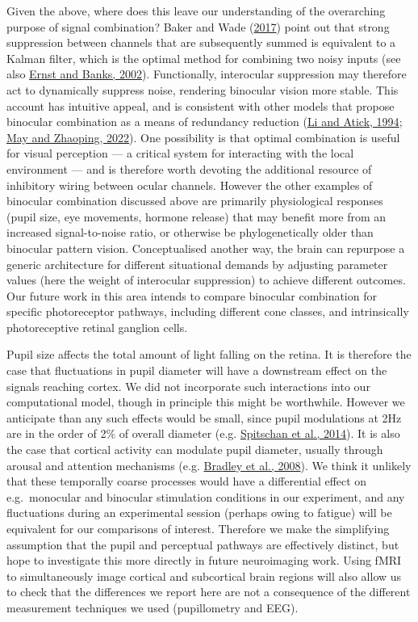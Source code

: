 \documentclass[
]{article}
\begin{document}
Given the above, where does this leave our understanding of the overarching purpose of signal combination? Baker and Wade (\protect\hyperlink{ref-Baker2017}{2017}) point out that strong suppression between channels that are subsequently summed is equivalent to a Kalman filter, which is the optimal method for combining two noisy inputs (see also \protect\hyperlink{ref-Ernst2002}{Ernst and Banks, 2002}). Functionally, interocular suppression may therefore act to dynamically suppress noise, rendering binocular vision more stable. This account has intuitive appeal, and is consistent with other models that propose binocular combination as a means of redundancy reduction (\protect\hyperlink{ref-Li1994}{Li and Atick, 1994}; \protect\hyperlink{ref-May2022}{May and Zhaoping, 2022}). One possibility is that optimal combination is useful for visual perception --- a critical system for interacting with the local environment --- and is therefore worth devoting the additional resource of inhibitory wiring between ocular channels. However the other examples of binocular combination discussed above are primarily physiological responses (pupil size, eye movements, hormone release) that may benefit more from an increased signal-to-noise ratio, or otherwise be phylogenetically older than binocular pattern vision. Conceptualised another way, the brain can repurpose a generic architecture for different situational demands by adjusting parameter values (here the weight of interocular suppression) to achieve different outcomes. Our future work in this area intends to compare binocular combination for specific photoreceptor pathways, including different cone classes, and intrinsically photoreceptive retinal ganglion cells.

Pupil size affects the total amount of light falling on the retina. It is therefore the case that fluctuations in pupil diameter will have a downstream effect on the signals reaching cortex. We did not incorporate such interactions into our computational model, though in principle this might be worthwhile. However we anticipate than any such effects would be small, since pupil modulations at 2Hz are in the order of 2\% of overall diameter (e.g. \protect\hyperlink{ref-Spitschan2014}{Spitschan et al., 2014}). It is also the case that cortical activity can modulate pupil diameter, usually through arousal and attention mechanisms (e.g. \protect\hyperlink{ref-Bradley2008}{Bradley et al., 2008}). We think it unlikely that these temporally coarse processes would have a differential effect on e.g.~monocular and binocular stimulation conditions in our experiment, and any fluctuations during an experimental session (perhaps owing to fatigue) will be equivalent for our comparisons of interest. Therefore we make the simplifying assumption that the pupil and perceptual pathways are effectively distinct, but hope to investigate this more directly in future neuroimaging work. Using fMRI to simultaneously image cortical and subcortical brain regions will also allow us to check that the differences we report here are not a consequence of the different measurement techniques we used (pupillometry and EEG).
\end{document}
